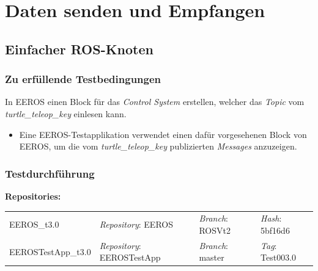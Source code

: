 \section{Daten senden und Empfangen}
\subsection{Einfacher ROS-Knoten}
\subsubsection{Zu erfüllende Testbedingungen}
In EEROS einen Block für das \textit{Control System} erstellen, welcher das \textit{Topic} vom \textit{turtle\_teleop\_key} einlesen kann.
\begin{itemize}
\item Eine EEROS-Testapplikation verwendet einen dafür vorgesehenen Block von EEROS, um die vom \textit{turtle\_teleop\_key} publizierten \textit{Messages} anzuzeigen.
\end{itemize}

\subsubsection{Testdurchführung}
\textbf{Repositories:} \\
\begin{tabular}
  { l						| l			 							l								 l								}

  EEROS\_t3.0				& \textit{Repository}: EEROS			& \textit{Branch}: ROSVt2		& \textit{Hash}: 5bf16d6		\\
  EEROSTestApp\_t3.0		& \textit{Repository}: EEROSTestApp	& \textit{Branch}: master		& \textit{Tag}: Test003.0		\\
\end{tabular}

